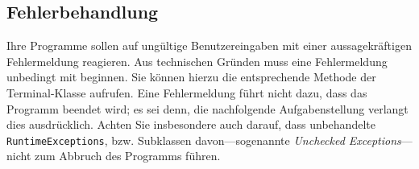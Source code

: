 \begin{tcolorbox}
\subsection*{Fehlerbehandlung}

Ihre Programme sollen auf ungültige Benutzereingaben mit einer aussagekräftigen Fehlermeldung reagieren. Aus technischen Gründen muss eine Fehlermeldung unbedingt mit  beginnen. Sie können hierzu die entsprechende Methode der Terminal-Klasse aufrufen. Eine Fehlermeldung führt nicht dazu, dass das Programm beendet wird; es sei denn, die nachfolgende Aufgabenstellung verlangt dies ausdrücklich. Achten Sie insbesondere auch darauf, dass unbehandelte \texttt{RuntimeExceptions}, bzw. Subklassen davon—sogenannte \emph{Unchecked Exceptions}—nicht zum Abbruch des Programms führen.

\end{tcolorbox}


